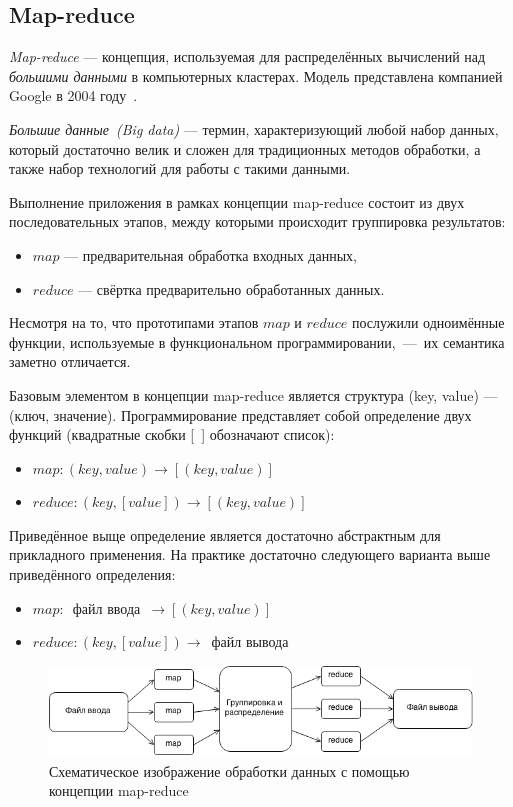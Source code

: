 \documentclass[12pt,a4paper,oneside]{extarticle}
\begin{document}
    \subsection{Map-reduce}
        {\it Map-reduce} --- концепция, используемая для распределённых вычислений над {\it большими данными} в компьютерных кластерах. Модель представлена компанией Google в 2004 году~\cite{mapreduce}.

        {\it Большие данные~(Big data)} --- термин, характеризующий любой набор данных, который достаточно велик и сложен для традиционных методов обработки, а также набор технологий для работы с такими данными.
        
        Выполнение приложения в рамках концепции map-reduce состоит из двух последовательных этапов, между которыми происходит группировка результатов:
        \begin{itemize}
            \item $map$ --- предварительная обработка входных данных,
            \item $reduce$ --- свёртка предварительно обработанных данных.
        \end{itemize}

        Несмотря на то, что прототипами этапов $map$ и $reduce$ послужили одноимённые функции, используемые в функциональном программировании,~---~их семантика заметно отличается.

        Базовым элементом в концепции map-reduce является структура (key, value) --- (ключ, значение). Программирование представляет собой определение двух функций (квадратные скобки [~] обозначают список):
        \begin{itemize}
            \item $map: (key, value)\rightarrow[(key, value)]$
            \item $reduce: (key, [value])\rightarrow[(key, value)]$
        \end{itemize}

        Приведённое выще определение является достаточно абстрактным для прикладного применения. На практике достаточно следующего варианта выше приведённого определения:
        \begin{itemize}
            \item $map: $~файл ввода~$\rightarrow[(key, value)]$
            \item $reduce: (key, [value])\rightarrow$~файл вывода
        \end{itemize}

        \begin{figure}[h!]
            \centering
            \includegraphics[scale=0.7]{mapreduce.png}
            \caption{Схематическое изображение обработки данных с помощью концепции map-reduce}
            \label{pic:mapreduce}
        \end{figure}
\end{document}
